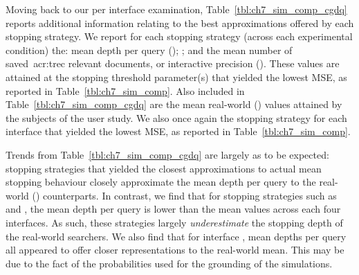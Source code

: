 Moving back to our per interface examination, Table~\ref{tbl:ch7_sim_comp_cgdq} reports additional information relating to the best approximations offered by each stopping strategy. We report for each stopping strategy (across each experimental condition) the: mean depth per query (); ; and the mean number of saved~\gls{acr:trec} relevant documents, or interactive precision (). These values are attained at the stopping threshold parameter(s) that yielded the lowest MSE, as reported in Table~\ref{tbl:ch7_sim_comp}. Also included in Table~\ref{tbl:ch7_sim_comp_cgdq} are the mean real-world () values attained by the subjects of the user study. We also once again  the stopping strategy for each interface that yielded the lowest MSE, as reported in Table~\ref{tbl:ch7_sim_comp}.

Trends from Table~\ref{tbl:ch7_sim_comp_cgdq} are largely as to be expected: stopping strategies that yielded the closest approximations to actual mean stopping behaviour closely approximate the mean depth per query to the real-world () counterparts. In contrast, we find that for stopping strategies such as  and , the mean depth per query is lower than the mean values across each four interfaces. As such, these strategies largely \emph{underestimate} the stopping depth of the real-world searchers. We also find that for interface , mean depths per query all appeared to offer closer representations to the real-world mean. This may be due to the fact of the probabilities used for the grounding of the simulations.

